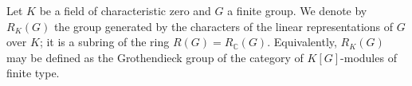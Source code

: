 Let $K$ be a field of characteristic zero and $G$ a finite group. We denote by $R_K(G)$ the group generated by the characters of the linear representations of $G$ over $K$; it is a subring of the ring $R(G) = R_{\mathbb{C}}(G)$. Equivalently, $R_K(G)$ may be defined as the Grothendieck group of the category of $K[G]$-modules of finite type.
